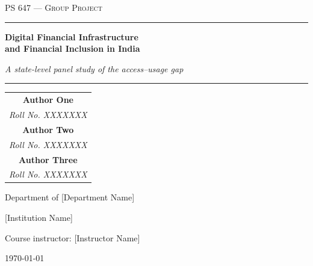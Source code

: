 \documentclass[11pt,a4paper,oneside]{report}
\begin{document}
\begin{titlepage}
\centering
\vspace*{2cm}

{\Large\scshape PS 647 --- Group Project\par}
\vspace{1.2cm}

{\color{rulecolour}\rule{\textwidth}{0.4pt}}
\vspace{0.8cm}

{\Huge\bfseries Digital Financial Infrastructure\\[0.25cm]
and Financial Inclusion in India\par}
\vspace{0.6cm}

{\large\itshape A state-level panel study of the access--usage gap\par}
\vspace{0.8cm}

{\color{rulecolour}\rule{\textwidth}{0.4pt}}
\vspace{1.8cm}

{\large
\begin{tabular}{c}
\textbf{Author One} \\ \textit{Roll No. XXXXXXX} \\[0.8em]
\textbf{Author Two} \\ \textit{Roll No. XXXXXXX} \\[0.8em]
\textbf{Author Three} \\ \textit{Roll No. XXXXXXX} \\
\end{tabular}\par}
\vspace{1.8cm}

{\large Department of [Department Name]\par}
{\large [Institution Name]\par}
\vspace{0.6cm}
{\large Course instructor: [Instructor Name]\par}

\vfill
{\large \today\par}
\end{titlepage}

\end{document}
